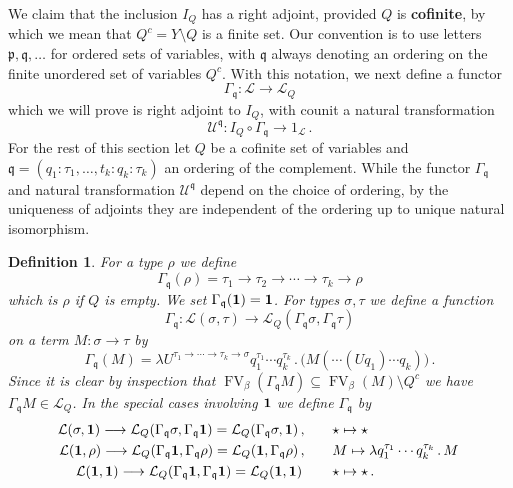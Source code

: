 \documentclass[english,letter paper,12pt,leqno]{article}
\def\be{\begin{equation}}
\def\ee{\end{equation}}
\def\ldot{\,.\,}
\def\typearrow{\Rightarrow}
\def\FV{\operatorname{FV}}
\theoremstyle{example}
\newtheorem{definition}[theorem]{Definition}
\numberwithin{equation}{section}
\newcommand{\call}[1]{\mathcal{#1}}
\def\be{\begin{equation}}
\def\ee{\end{equation}}
\def\ldot{\,.\,}
\def\FV{\operatorname{FV}}
\def\typearrow{\rightarrow}
\begin{document}
We claim that the inclusion $I_Q$ has a right adjoint, provided $Q$ is \textbf{cofinite}, by which we mean that $Q^c = Y \setminus Q$ is a finite set. Our convention is to use letters $\mathfrak{p},\mathfrak{q},\ldots$ for ordered sets of variables, with $\mathfrak{q}$ always denoting an ordering on the finite unordered set of variables $Q^c$. With this notation, we next define a functor
\[
\Gamma_\mathfrak{q}: \call{L} \longrightarrow \call{L}_Q
\]
which we will prove is right adjoint to $I_Q$, with counit a natural transformation
\[
\mathscr{U}^\mathfrak{q}: I_Q \circ \Gamma_\mathfrak{q} \longrightarrow 1_{\call{L}}\,.
\]
For the rest of this section let $Q$ be a cofinite set of variables and $\mathfrak{q} = (q_1: \tau_1, \ldots, t_k:q_k: \tau_k)$ an ordering of the complement. While the functor $\Gamma_\mathfrak{q}$ and natural transformation $\mathscr{U}^\mathfrak{q}$ depend on the choice of ordering, by the uniqueness of adjoints they are independent of the ordering up to unique natural isomorphism.
\begin{definition}\label{definition:gamma} For a type $\rho$ we define
	\[
	\Gamma_{\mathfrak{q}}(\rho) = \tau_1 \typearrow \tau_2 \typearrow \cdots \typearrow \tau_k \typearrow \rho
	\]
	which is $\rho$ if $Q$ is empty. We set $\Gamma_\mathfrak{q}(\bold{1}) = \bold{1}$. For types $\sigma, \tau$ we define a function
	\be
	\Gamma_\mathfrak{q}: \call{L}(\sigma, \tau) \longrightarrow \call{L}_Q(\Gamma_\mathfrak{q} \sigma, \Gamma_\mathfrak{q} \tau)
	\ee
	on a term $M: \sigma \typearrow \tau$ by
	\be\label{eq:gammaqM}
	\Gamma_\mathfrak{q}(M) = \lambda U^{\tau_1 \typearrow \cdots \typearrow \tau_k \typearrow \sigma} q_1^{\tau_1} \cdots q_k^{\tau_k} \ldot \big( M (\cdots (U q_1) \cdots q_k) \big)\,.
	\ee
	Since it is clear by inspection that $\FV_\beta(\Gamma_{\mathfrak{q}} M) \subseteq \FV_\beta(M) \setminus Q^c$ we have $\Gamma_\mathfrak{q} M \in \call{L}_Q$. In the special cases involving $\bold{1}$ we define $\Gamma_\mathfrak{q}$ by
	\begin{align*}
		\call{L}(\sigma, \bold{1}) \longrightarrow \call{L}_Q(\Gamma_\mathfrak{q} \sigma, \Gamma_\mathfrak{q} \bold{1} ) = \call{L}_Q( \Gamma_\mathfrak{q} \sigma, \bold{1} )\,, \qquad &\star \mapsto \star\,\\
		\call{L}(\bold{1}, \rho) \longrightarrow \call{L}_Q(\Gamma_\mathfrak{q} \bold{1}, \Gamma_\mathfrak{q} \rho) = \call{L}_Q( \bold{1}, \Gamma_\mathfrak{q} \rho )\,,\qquad & M \mapsto \lambda q_1^{\tau_1} \cdots q_k^{\tau_k} \ldot M\,\\
		\call{L}(\bold{1}, \bold{1}) \longrightarrow \call{L}_Q(\Gamma_\mathfrak{q} \bold{1}, \Gamma_\mathfrak{q} \bold{1}) = \call{L}_Q(\bold{1}, \bold{1})\,\qquad & \star \mapsto \star\,.
	\end{align*}
\end{definition}
\end{document}

